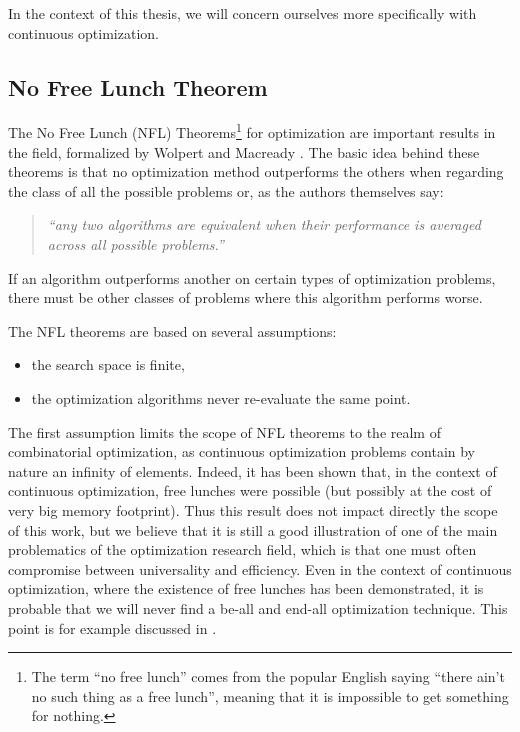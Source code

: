 In the context of this thesis, we will concern ourselves more specifically with continuous optimization.

\subsection{No Free Lunch Theorem}

The No Free Lunch (NFL) Theorems\footnote{The term \enquote{no free lunch} comes from the popular English saying \enquote{there ain't no such thing as a free lunch}, meaning that it is impossible to get something for nothing.} for optimization are important results in the field, formalized by Wolpert and Macready \cite{585893}. The basic idea behind these theorems is that no optimization method outperforms the others when regarding the class of all the possible problems or, as the authors themselves say:
\begin{quote}\textit{
\enquote{any two algorithms are equivalent when their performance is averaged across all possible problems.}}
\end{quote}
If an algorithm outperforms another on certain types of optimization problems, there must be other classes of problems where this algorithm performs worse.

The NFL theorems are based on several assumptions:
\begin{itemize}

\item the search space is finite,

\item the optimization algorithms never re-evaluate the same point.

\end{itemize}

The first assumption limits the scope of NFL theorems to the realm of combinatorial optimization, as continuous optimization problems contain by nature an infinity of elements. Indeed, it has been shown that, in the context of continuous optimization, free lunches were possible \cite{Auger-s00453-008-9244-5} (but possibly at the cost of very big memory footprint). Thus this result does not impact directly the scope of this work, but we believe that it is still a good illustration of one of the main problematics of the optimization research field, which is that one must often compromise between universality and efficiency. Even in the context of continuous optimization, where the existence of free lunches has been demonstrated, it is probable that we will never find a be-all and end-all optimization technique. This point is for example discussed in \cite{Doe05}.


